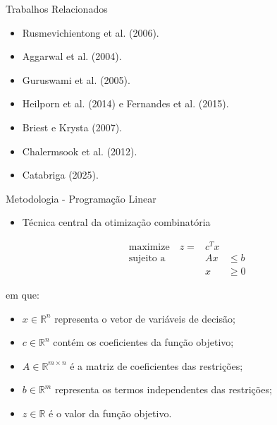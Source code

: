 \documentclass{beamer}
\begin{document}
\begin{frame}{Trabalhos Relacionados}
    
    \begin{itemize}
        \item Rusmevichientong et al. (2006).
        \pause
        \item Aggarwal et al. (2004).
        \pause
        \item Guruswami et al. (2005).
        \pause
        \item Heilporn et al. (2014) e Fernandes et al. (2015).
        \pause
        \item Briest e Krysta (2007).
        \pause
        \item Chalermsook et al. (2012).
        \pause
        \item Catabriga (2025).
    \end{itemize}

\end{frame}

\begin{frame}{Metodologia - Programação Linear}
    
    \begin{itemize}
        \item Técnica central da otimização combinatória
    \end{itemize}

    \[
        \begin{aligned}
        &\text{maximize} \quad  z  = &c^T x \\
        &\text{sujeito a} \quad & Ax & \leq  b \\
        & & x & \geq  0
        \end{aligned}
    \]

    em que:
    \begin{itemize}
        \item $x \in \mathbb{R}^n$ representa o vetor de variáveis de decisão;
        \item $c \in \mathbb{R}^n$ contém os coeficientes da função objetivo;
        \item $A \in \mathbb{R}^{m \times n}$ é a matriz de coeficientes das restrições;
        \item $b \in \mathbb{R}^m$ representa os termos independentes das restrições;
        \item $z \in \mathbb{R}$ é o valor da função objetivo.
    \end{itemize}
\end{frame}
\end{document}
